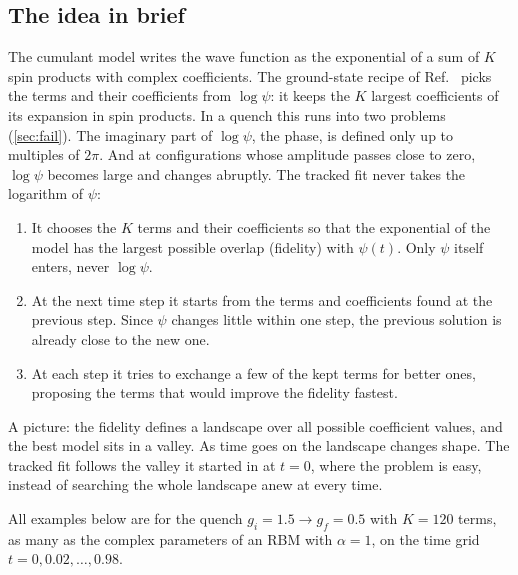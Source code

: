 \documentclass[11pt,a4paper]{article}
\begin{document}
\subsection{The idea in brief}
The cumulant model writes the wave function as the exponential of a sum of $K$ spin products with complex coefficients. The ground-state recipe of Ref.~\cite{Cortes25} picks the terms and their coefficients from $\log\psi$: it keeps the $K$ largest coefficients of its expansion in spin products. In a quench this runs into two problems (\cref{sec:fail}). The imaginary part of $\log\psi$, the phase, is defined only up to multiples of $2\pi$. And at configurations whose amplitude passes close to zero, $\log\psi$ becomes large and changes abruptly. The tracked fit never takes the logarithm of $\psi$:
\begin{enumerate}
  \item It chooses the $K$ terms and their coefficients so that the exponential of the model has the largest possible overlap (fidelity) with $\psi(t)$. Only $\psi$ itself enters, never $\log\psi$.
  \item At the next time step it starts from the terms and coefficients found at the previous step. Since $\psi$ changes little within one step, the previous solution is already close to the new one.
  \item At each step it tries to exchange a few of the kept terms for better ones, proposing the terms that would improve the fidelity fastest.
\end{enumerate}
A picture: the fidelity defines a landscape over all possible coefficient values, and the best model sits in a valley. As time goes on the landscape changes shape. The tracked fit follows the valley it started in at $t=0$, where the problem is easy, instead of searching the whole landscape anew at every time.

All examples below are for the quench $g_i=1.5\to g_f=0.5$ with $K=120$ terms, as many as the complex parameters of an RBM with $\alpha=1$, on the time grid $t=0,0.02,\dots,0.98$.
\end{document}
